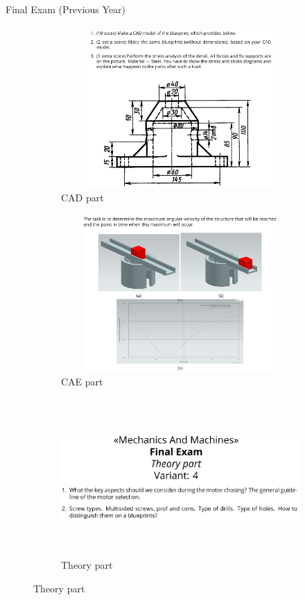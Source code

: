 \documentclass[aspectratio=169]{beamer}
\begin{document}
\begin{frame}[t]{Final Exam (Previous Year)}
\framesubtitle{}
    \begin{figure}[H]
        \begin{subfigure}{0.32\textwidth}
            \centering\includegraphics[height=6cm,width=1\textwidth,keepaspectratio]{resources/ex1.png}
            \caption*{CAD part}
            \label{fig:resources/ex1.png}
        \end{subfigure}
        \begin{subfigure}{0.32\textwidth}
            \centering\includegraphics[height=6cm,width=1\textwidth,keepaspectratio]{resources/ex2.png}
            \caption*{CAE part}
            \label{fig:resources/ex2.png}
        \end{subfigure}
        \begin{subfigure}{0.32\textwidth}
            \centering\includegraphics[height=6cm,width=1\textwidth,keepaspectratio]{resources/ex3.png}
            \caption*{Theory part}
            \label{fig:resources/ex3.png}
        \end{subfigure}
    \end{figure}
\end{frame}
\end{document}
